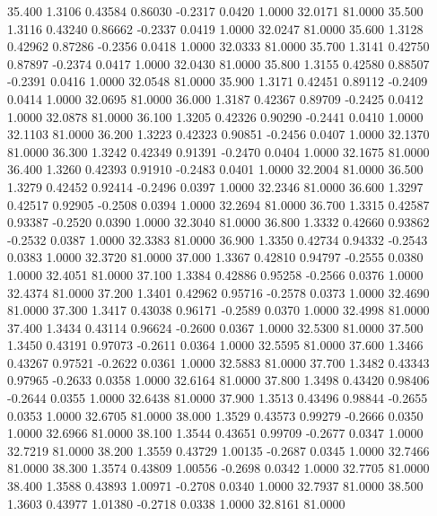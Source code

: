   35.400   1.3106   0.43584   0.86030  -0.2317   0.0420   1.0000  32.0171  81.0000
  35.500   1.3116   0.43240   0.86662  -0.2337   0.0419   1.0000  32.0247  81.0000
  35.600   1.3128   0.42962   0.87286  -0.2356   0.0418   1.0000  32.0333  81.0000
  35.700   1.3141   0.42750   0.87897  -0.2374   0.0417   1.0000  32.0430  81.0000
  35.800   1.3155   0.42580   0.88507  -0.2391   0.0416   1.0000  32.0548  81.0000
  35.900   1.3171   0.42451   0.89112  -0.2409   0.0414   1.0000  32.0695  81.0000
  36.000   1.3187   0.42367   0.89709  -0.2425   0.0412   1.0000  32.0878  81.0000
  36.100   1.3205   0.42326   0.90290  -0.2441   0.0410   1.0000  32.1103  81.0000
  36.200   1.3223   0.42323   0.90851  -0.2456   0.0407   1.0000  32.1370  81.0000
  36.300   1.3242   0.42349   0.91391  -0.2470   0.0404   1.0000  32.1675  81.0000
  36.400   1.3260   0.42393   0.91910  -0.2483   0.0401   1.0000  32.2004  81.0000
  36.500   1.3279   0.42452   0.92414  -0.2496   0.0397   1.0000  32.2346  81.0000
  36.600   1.3297   0.42517   0.92905  -0.2508   0.0394   1.0000  32.2694  81.0000
  36.700   1.3315   0.42587   0.93387  -0.2520   0.0390   1.0000  32.3040  81.0000
  36.800   1.3332   0.42660   0.93862  -0.2532   0.0387   1.0000  32.3383  81.0000
  36.900   1.3350   0.42734   0.94332  -0.2543   0.0383   1.0000  32.3720  81.0000
  37.000   1.3367   0.42810   0.94797  -0.2555   0.0380   1.0000  32.4051  81.0000
  37.100   1.3384   0.42886   0.95258  -0.2566   0.0376   1.0000  32.4374  81.0000
  37.200   1.3401   0.42962   0.95716  -0.2578   0.0373   1.0000  32.4690  81.0000
  37.300   1.3417   0.43038   0.96171  -0.2589   0.0370   1.0000  32.4998  81.0000
  37.400   1.3434   0.43114   0.96624  -0.2600   0.0367   1.0000  32.5300  81.0000
  37.500   1.3450   0.43191   0.97073  -0.2611   0.0364   1.0000  32.5595  81.0000
  37.600   1.3466   0.43267   0.97521  -0.2622   0.0361   1.0000  32.5883  81.0000
  37.700   1.3482   0.43343   0.97965  -0.2633   0.0358   1.0000  32.6164  81.0000
  37.800   1.3498   0.43420   0.98406  -0.2644   0.0355   1.0000  32.6438  81.0000
  37.900   1.3513   0.43496   0.98844  -0.2655   0.0353   1.0000  32.6705  81.0000
  38.000   1.3529   0.43573   0.99279  -0.2666   0.0350   1.0000  32.6966  81.0000
  38.100   1.3544   0.43651   0.99709  -0.2677   0.0347   1.0000  32.7219  81.0000
  38.200   1.3559   0.43729   1.00135  -0.2687   0.0345   1.0000  32.7466  81.0000
  38.300   1.3574   0.43809   1.00556  -0.2698   0.0342   1.0000  32.7705  81.0000
  38.400   1.3588   0.43893   1.00971  -0.2708   0.0340   1.0000  32.7937  81.0000
  38.500   1.3603   0.43977   1.01380  -0.2718   0.0338   1.0000  32.8161  81.0000
